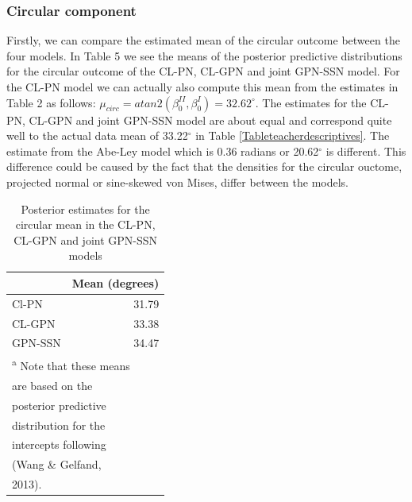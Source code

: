 \documentclass[11pt,]{article}
\begin{document}
\subsubsection{Circular component}

Firstly, we can compare the estimated mean of the circular outcome
between the four models. In Table 5 we see the means of the posterior
predictive distributions for the circular outcome of the CL-PN, CL-GPN
and joint GPN-SSN model. For the CL-PN model we can actually also
compute this mean from the estimates in Table 2 as follows:
\(\mu_{circ} = atan2(\beta_0^{II}, \beta_0^{I}) = 32.62^\circ\). The
estimates for the CL-PN, CL-GPN and joint GPN-SSN model are about equal
and correspond quite well to the actual data mean of 33.22\(^\circ\) in
Table \ref{Tableteacherdescriptives}. The estimate from the Abe-Ley
model which is 0.36 radians or 20.62\(^\circ\) is different. This
difference could be caused by the fact that the densities for the
circular ouctome, projected normal or sine-skewed von Mises, differ
between the models.

\begin{table}

\caption{\label{tab:means}Posterior estimates for the circular mean in the CL-PN, CL-GPN and joint GPN-SSN models}
\centering
\begin{tabular}[t]{lr}
\toprule
  & Mean (degrees)\\
\midrule
Cl-PN & 31.79\\
CL-GPN & 33.38\\
GPN-SSN & 34.47\\
\bottomrule
\multicolumn{2}{l}{\textsuperscript{a} Note that these means}\\
\multicolumn{2}{l}{are based on the}\\
\multicolumn{2}{l}{posterior predictive}\\
\multicolumn{2}{l}{distribution for the}\\
\multicolumn{2}{l}{intercepts following}\\
\multicolumn{2}{l}{(Wang \& Gelfand,}\\
\multicolumn{2}{l}{2013).}\\
\end{tabular}
\end{table}
\end{document}

